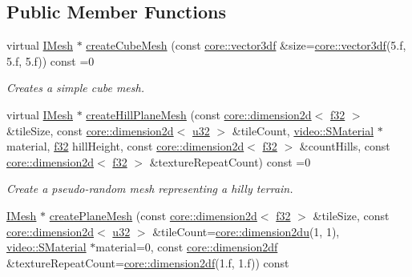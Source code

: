 \subsection*{Public Member Functions}
\begin{DoxyCompactItemize}
\item 
virtual \hyperlink{classirr_1_1scene_1_1IMesh}{I\+Mesh} $\ast$ \hyperlink{classirr_1_1scene_1_1IGeometryCreator_a43a1310362ad8e682c21375b2b9de39b}{create\+Cube\+Mesh} (const \hyperlink{namespaceirr_1_1core_a06f169d08b5c429f5575acb7edbad811}{core\+::vector3df} \&size=\hyperlink{namespaceirr_1_1core_a06f169d08b5c429f5575acb7edbad811}{core\+::vector3df}(5.f, 5.f, 5.f)) const =0
\begin{DoxyCompactList}\small\item\em Creates a simple cube mesh. \end{DoxyCompactList}\item 
virtual \hyperlink{classirr_1_1scene_1_1IMesh}{I\+Mesh} $\ast$ \hyperlink{classirr_1_1scene_1_1IGeometryCreator_a85cb5d4271a1ef4ba1706b15f70ae391}{create\+Hill\+Plane\+Mesh} (const \hyperlink{classirr_1_1core_1_1dimension2d}{core\+::dimension2d}$<$ \hyperlink{namespaceirr_a0277be98d67dc26ff93b1a6a1d086b07}{f32} $>$ \&tile\+Size, const \hyperlink{classirr_1_1core_1_1dimension2d}{core\+::dimension2d}$<$ \hyperlink{namespaceirr_a0416a53257075833e7002efd0a18e804}{u32} $>$ \&tile\+Count, \hyperlink{classirr_1_1video_1_1SMaterial}{video\+::\+S\+Material} $\ast$material, \hyperlink{namespaceirr_a0277be98d67dc26ff93b1a6a1d086b07}{f32} hill\+Height, const \hyperlink{classirr_1_1core_1_1dimension2d}{core\+::dimension2d}$<$ \hyperlink{namespaceirr_a0277be98d67dc26ff93b1a6a1d086b07}{f32} $>$ \&count\+Hills, const \hyperlink{classirr_1_1core_1_1dimension2d}{core\+::dimension2d}$<$ \hyperlink{namespaceirr_a0277be98d67dc26ff93b1a6a1d086b07}{f32} $>$ \&texture\+Repeat\+Count) const =0
\begin{DoxyCompactList}\small\item\em Create a pseudo-\/random mesh representing a hilly terrain. \end{DoxyCompactList}\item 
\hyperlink{classirr_1_1scene_1_1IMesh}{I\+Mesh} $\ast$ \hyperlink{classirr_1_1scene_1_1IGeometryCreator_ad584dd294e44104452c4418d70223381}{create\+Plane\+Mesh} (const \hyperlink{classirr_1_1core_1_1dimension2d}{core\+::dimension2d}$<$ \hyperlink{namespaceirr_a0277be98d67dc26ff93b1a6a1d086b07}{f32} $>$ \&tile\+Size, const \hyperlink{classirr_1_1core_1_1dimension2d}{core\+::dimension2d}$<$ \hyperlink{namespaceirr_a0416a53257075833e7002efd0a18e804}{u32} $>$ \&tile\+Count=\hyperlink{namespaceirr_1_1core_ad2e562e3219072e2f7fc7c2bba0ef0cb}{core\+::dimension2du}(1, 1), \hyperlink{classirr_1_1video_1_1SMaterial}{video\+::\+S\+Material} $\ast$material=0, const \hyperlink{namespaceirr_1_1core_af6dc5c45ff13e7712758c827ff58676b}{core\+::dimension2df} \&texture\+Repeat\+Count=\hyperlink{namespaceirr_1_1core_af6dc5c45ff13e7712758c827ff58676b}{core\+::dimension2df}(1.f, 1.f)) const

\end{DoxyCompactItemize}

